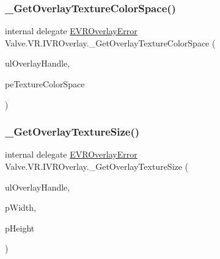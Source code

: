 \mbox{\label{struct_valve_1_1_v_r_1_1_i_v_r_overlay_a1622c8b6098d1b37a9a8f2a1b961f1cf}} 
\subsubsection{\texorpdfstring{\_GetOverlayTextureColorSpace()}{\_GetOverlayTextureColorSpace()}}
{\footnotesize\ttfamily internal delegate \mbox{\hyperlink{namespace_valve_1_1_v_r_aaee5c5144f42b7969d45b854f51b0c18}{E\+V\+R\+Overlay\+Error}} Valve.\+V\+R.\+I\+V\+R\+Overlay.\+\_\+\+Get\+Overlay\+Texture\+Color\+Space (\begin{DoxyParamCaption}\item[{ulong}]{ul\+Overlay\+Handle,  }\item[{ref \mbox{\hyperlink{namespace_valve_1_1_v_r_aeb0fba37ba28d8ca276d7c10f01809ac}{E\+Color\+Space}}}]{pe\+Texture\+Color\+Space }\end{DoxyParamCaption})}

\mbox{\label{struct_valve_1_1_v_r_1_1_i_v_r_overlay_af3140dc6e2be438f6c5989c7e49f5408}} 
\subsubsection{\texorpdfstring{\_GetOverlayTextureSize()}{\_GetOverlayTextureSize()}}
{\footnotesize\ttfamily internal delegate \mbox{\hyperlink{namespace_valve_1_1_v_r_aaee5c5144f42b7969d45b854f51b0c18}{E\+V\+R\+Overlay\+Error}} Valve.\+V\+R.\+I\+V\+R\+Overlay.\+\_\+\+Get\+Overlay\+Texture\+Size (\begin{DoxyParamCaption}\item[{ulong}]{ul\+Overlay\+Handle,  }\item[{ref uint}]{p\+Width,  }\item[{ref uint}]{p\+Height }\end{DoxyParamCaption})}

\mbox{\label{struct_valve_1_1_v_r_1_1_i_v_r_overlay_a1a1ee40ba7c9c9826b3646ded3df209f}} 

